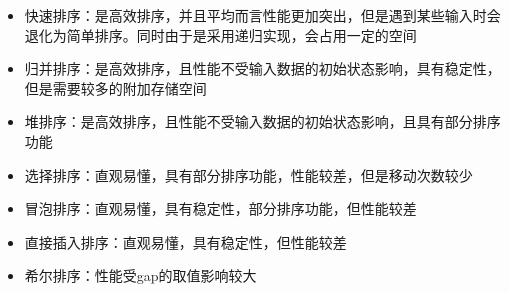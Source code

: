 \begin{itemize}
    \item 快速排序：是高效排序，并且平均而言性能更加突出，但是遇到某些输入时会退化为简单排序。同时由于是采用递归实现，会占用一定的空间
    \item 归并排序：是高效排序，且性能不受输入数据的初始状态影响，具有稳定性，但是需要较多的附加存储空间
    \item 堆排序：是高效排序，且性能不受输入数据的初始状态影响，且具有部分排序功能
    \item 选择排序：直观易懂，具有部分排序功能，性能较差，但是移动次数较少
    \item 冒泡排序：直观易懂，具有稳定性，部分排序功能，但性能较差
    \item 直接插入排序：直观易懂，具有稳定性，但性能较差
    \item 希尔排序：性能受gap的取值影响较大
\end{itemize}